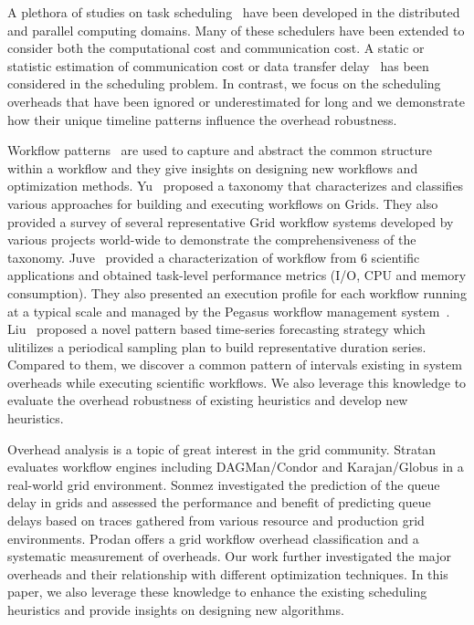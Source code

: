 A plethora of studies on task scheduling~\cite{Chetto1990, Dong2010, Yang03, Blythe2005} have been developed in the distributed and parallel computing domains. Many of these schedulers have been extended to consider both the computational cost and communication cost. A static or statistic estimation of communication cost or data transfer delay~\cite{Dong2010, Yang03} has been considered in the scheduling problem. In contrast, we focus on the scheduling overheads that have been ignored or underestimated for long and we demonstrate how their unique timeline patterns influence the overhead robustness. 

Workflow patterns~\cite{Yu2005, Juve2013, Liu2008} are used to capture and abstract the common structure within a workflow and they give insights on designing new workflows and optimization methods.  
Yu~\cite{Yu2005} proposed a taxonomy that characterizes and classifies various approaches for building and executing workflows on Grids. They also provided a survey of several representative Grid workflow systems developed by various projects world-wide to demonstrate the comprehensiveness of the taxonomy. Juve~\cite{Juve2013} provided a characterization of workflow from 6 scientific applications and obtained task-level performance metrics (I/O, CPU and memory consumption). They also presented an execution profile for each workflow running at a typical scale and managed by the Pegasus workflow management system~\cite{Deelman2005}. Liu~\cite{Liu2008} proposed a novel pattern based time-series forecasting strategy which ulitilizes a periodical sampling plan to build representative duration series. 
Compared to them, we discover a common pattern of intervals existing in system overheads while executing scientific workflows. We also leverage this knowledge to evaluate the overhead robustness of existing heuristics and develop new heuristics. 

Overhead analysis \cite{Prodan2008, Chen2011} is a topic of great interest in the grid community. Stratan \cite{Stratan2008} evaluates workflow engines including DAGMan/Condor and Karajan/Globus in a real-world grid environment. Sonmez \cite{Sonmez2006} investigated the prediction of the queue delay in grids and assessed the performance and benefit of predicting queue delays based on traces gathered from various resource and production grid environments. Prodan \cite{Prodan2008} offers a grid workflow overhead classification and a systematic measurement of overheads. Our work further investigated the major overheads and their relationship with different optimization techniques. 
In this paper, we also leverage these knowledge to enhance the existing scheduling heuristics and provide insights on designing new algorithms. 


